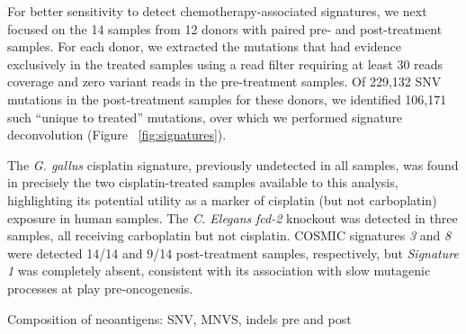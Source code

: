For better sensitivity to detect chemotherapy-associated signatures, we next focused on the 14 samples from 12 donors with paired pre- and post-treatment samples. For each donor, we extracted the mutations that had evidence exclusively in the treated samples using a read filter requiring at least 30 reads coverage and zero variant reads in the pre-treatment samples. Of 229,132 SNV mutations in the post-treatment samples for these donors, we identified 106,171 such ``unique to treated'' mutations, over which we performed signature deconvolution (Figure ~\ref{fig:signatures}).

The \textit{G. gallus} cisplatin signature, previously undetected in all samples, was found in precisely the two cisplatin-treated samples available to this analysis, highlighting its potential utility as a marker of cisplatin (but not carboplatin) exposure in human samples. The \textit{C. Elegans} \textit{fcd-2} knockout was detected in three samples, all receiving carboplatin but not cisplatin. COSMIC signatures \textit{3} and \textit{8} were detected 14/14 and 9/14 post-treatment samples, respectively, but \textit{Signature 1} was completely absent, consistent with its association with slow mutagenic processes at play pre-oncogenesis.


Composition of neoantigens: SNV, MNVS, indels pre and post

